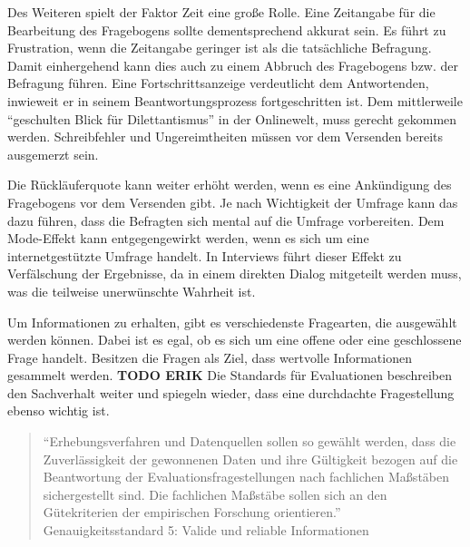 Des Weiteren spielt der Faktor Zeit eine große Rolle. 
Eine Zeitangabe für die Bearbeitung des Fragebogens sollte dementsprechend akkurat sein.
Es führt zu Frustration, wenn die Zeitangabe geringer ist als die tatsächliche Befragung.
Damit einhergehend kann dies auch zu einem Abbruch des Fragebogens bzw. der Befragung führen. 
Eine Fortschrittsanzeige verdeutlicht dem Antwortenden, inwieweit er in seinem Beantwortungsprozess fortgeschritten ist. 
Dem mittlerweile \enquote{geschulten Blick für Dilettantismus} in der Onlinewelt, muss gerecht gekommen werden.
Schreibfehler und Ungereimtheiten müssen vor dem Versenden bereits ausgemerzt sein.\autocite[Siehe][S. 37]{2009Fragebogen} %

Die Rückläuferquote kann weiter erhöht werden, wenn es eine Ankündigung des Fragebogens vor dem Versenden gibt. 
Je nach Wichtigkeit der Umfrage kann das dazu führen, dass die Befragten sich mental auf die Umfrage vorbereiten.\autocite[Vgl.][S. 38]{Umfragenforschung}
Dem Mode-Effekt kann entgegengewirkt werden, wenn es sich um eine internetgestützte Umfrage handelt.
In Interviews führt dieser Effekt zu Verfälschung der Ergebnisse, da in einem direkten Dialog mitgeteilt werden muss, was die teilweise unerwünschte Wahrheit ist.\autocite[Vgl.][S. 163]{Umfragenforschung}
 
Um Informationen zu erhalten, gibt es verschiedenste Fragearten, die ausgewählt werden können.
Dabei ist es egal, ob es sich um eine offene oder eine geschlossene Frage handelt.\autocite[Vgl.][S. 31]{2009Fragebogen} %
Besitzen die Fragen als Ziel, dass wertvolle Informationen gesammelt werden. \textbf{TODO ERIK} %
Die Standards für Evaluationen beschreiben den Sachverhalt weiter und spiegeln wieder, dass eine durchdachte Fragestellung ebenso wichtig ist. %

\begin{quote} \enquote{Erhebungsverfahren und Datenquellen sollen so gewählt werden, dass die Zuverlässigkeit der gewonnenen Daten und ihre Gültigkeit bezogen auf die Beantwortung der Evaluationsfragestellungen nach fachlichen Maßstäben sichergestellt sind. Die fachlichen Maßstäbe sollen sich an den Gütekriterien der empirischen Forschung orientieren.} Genauigkeitsstandard 5: Valide und reliable Informationen\autocite[Siehe][]{DegEval} %
\end{quote}

